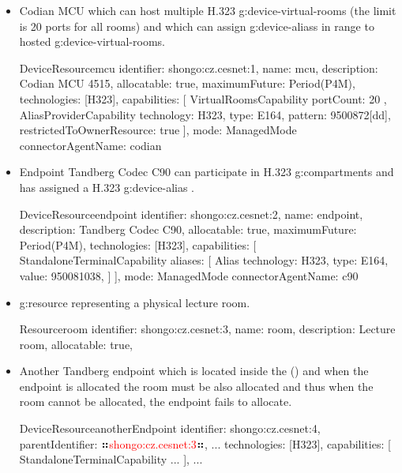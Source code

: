 \begin{itemize}

\item Codian MCU which can host multiple H.323 \glspl{g:device-virtual-room} (the limit is 20 ports for all rooms) and which can assign \glspl{g:device-alias} in range  to hosted \glspl{g:device-virtual-room}.

\begin{ObjectCode}{DeviceResource}{mcu}{}
identifier: shongo:cz.cesnet:1,
name: mcu,
description: Codian MCU 4515,
allocatable: true,
maximumFuture: Period(P4M),
technologies: [H323],
capabilities: [
  VirtualRoomsCapability {
    portCount: 20
  },
  AliasProviderCapability {
    technology: H323,
    type: E164,
    pattern: 9500872[dd],
    restrictedToOwnerResource: true 
  }
],
mode: ManagedMode{
  connectorAgentName: codian
}
\end{ObjectCode}

\item Endpoint Tandberg Codec C90 can participate in H.323 \glspl{g:compartment} and has assigned a H.323 \gls{g:device-alias} . 

\begin{ObjectCode}{DeviceResource}{endpoint}{}
identifier: shongo:cz.cesnet:2,
name: endpoint,
description: Tandberg Codec C90,
allocatable: true,
maximumFuture: Period(P4M),
technologies: [H323],
capabilities: [
  StandaloneTerminalCapability {
    aliases: [
      Alias {
        technology: H323,
        type: E164,
        value: 950081038,
      }
    ]
  }
],
mode: ManagedMode{
  connectorAgentName: c90
}
\end{ObjectCode}

\item \Gls{g:resource} representing a physical lecture room.

\begin{ObjectCode}{Resource}{room}{}
identifier: shongo:cz.cesnet:3,
name: room,
description: Lecture room,
allocatable: true,
\end{ObjectCode}


\item Another Tandberg endpoint which is located inside the  () and when the endpoint is allocated the room must be also allocated and thus when the room cannot be allocated, the endpoint fails to allocate.

\begin{ObjectCode}{DeviceResource}{anotherEndpoint}{}
identifier: shongo:cz.cesnet:4,
parentIdentifier: ⠶\textcolor{red}{shongo:cz.cesnet:3}⠶,
...
technologies: [H323],
capabilities: [
  StandaloneTerminalCapability {
    ...
  }
],
...
\end{ObjectCode}


\end{itemize}
